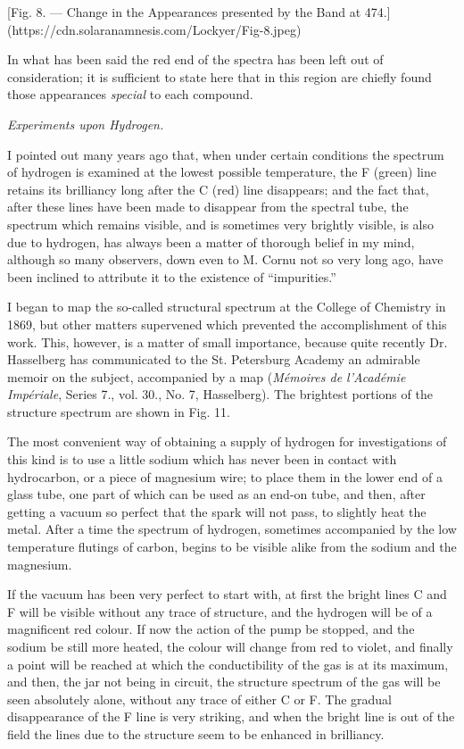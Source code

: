 \documentclass[a4paper, 12pt, oneside, polutonikogreek, english]{article}
\begin{document}
[Fig. 8. --- Change in the Appearances presented by the Band at 474.](https://cdn.solaranamnesis.com/Lockyer/Fig-8.jpeg)

In what has been said the red end of the spectra has been left out of consideration; it is sufficient to state here that in this region are chiefly found those appearances \emph{special} to each compound.

\emph{Experiments upon Hydrogen.}

I pointed out many years ago that, when under certain conditions the spectrum of hydrogen is examined at the lowest possible temperature, the F (green) line retains its brilliancy long after the C (red) line disappears; and the fact that, after these lines have been made to disappear from the spectral tube, the spectrum which remains visible, and is sometimes very brightly visible, is also due to hydrogen, has always been a matter of thorough belief in my mind, although so many observers, down even to M. Cornu not so very long ago, have been inclined to attribute it to the existence of ``impurities.''

I began to map the so-called structural spectrum at the College of Chemistry in 1869, but other matters supervened which prevented the accomplishment of this work. This, however, is a matter of small importance, because quite recently Dr. Hasselberg has communicated to the St. Petersburg Academy an admirable memoir on the subject, accompanied by a map (\emph{Mémoires de l'Académie Impériale}, Series 7., vol. 30., No. 7, Hasselberg). The brightest portions of the structure spectrum are shown in Fig. 11.

The most convenient way of obtaining a supply of hydrogen for investigations of this kind is to use a little sodium which has never been in contact with hydrocarbon, or a piece of magnesium wire; to place them in the lower end of a glass tube, one part of which can be used as an end-on tube, and then, after getting a vacuum so perfect that the spark will not pass, to slightly heat the metal. After a time the spectrum of hydrogen, sometimes accompanied by the low temperature flutings of carbon, begins to be visible alike from the sodium and the magnesium.

If the vacuum has been very perfect to start with, at first the bright lines C and F will be visible without any trace of structure, and the hydrogen will be of a magnificent red colour. If now the action of the pump be stopped, and the sodium be still more heated, the colour will change from red to violet, and finally a point will be reached at which the conductibility of the gas is at its maximum, and then, the jar not being in circuit, the structure spectrum of the gas will be seen absolutely alone, without any trace of either C or F. The gradual disappearance of the F line is very striking, and when the bright line is out of the field the lines due to the structure seem to be enhanced in brilliancy.
\end{document}
